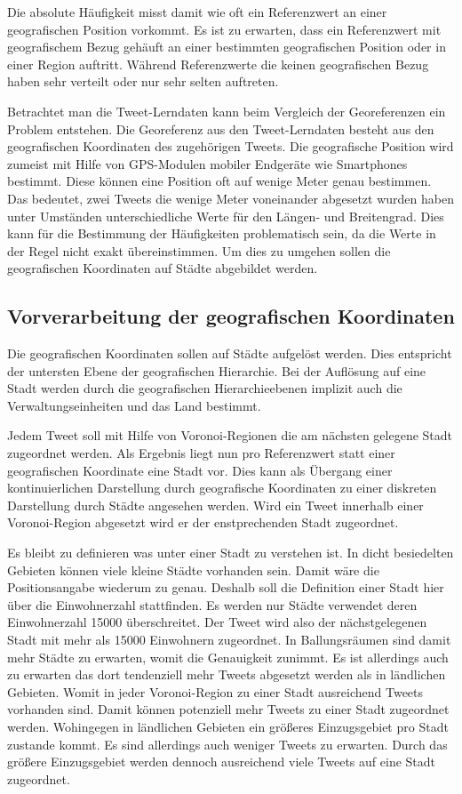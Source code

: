 			Die absolute Häufigkeit misst damit wie oft ein Referenzwert an einer geografischen Position vorkommt.
			Es ist zu erwarten, dass ein Referenzwert mit geografischem Bezug gehäuft an einer bestimmten geografischen Position oder in einer Region auftritt.
			Während Referenzwerte die keinen geografischen Bezug haben sehr verteilt oder nur sehr selten auftreten. 

			Betrachtet man die Tweet-Lerndaten kann beim Vergleich der Georeferenzen ein Problem entstehen.
			Die Georeferenz aus den Tweet-Lerndaten besteht aus den geografischen Koordinaten des zugehörigen Tweets.
			Die geografische Position wird zumeist mit Hilfe von GPS-Modulen mobiler Endgeräte wie Smartphones bestimmt. 
			Diese können eine Position oft auf wenige Meter genau bestimmen.
			Das bedeutet, zwei Tweets die wenige Meter voneinander abgesetzt wurden haben unter Umständen unterschiedliche Werte für den Längen- und Breitengrad.
			Dies kann für die Bestimmung der Häufigkeiten problematisch sein, da die Werte in der Regel nicht exakt übereinstimmen.
			Um dies zu umgehen sollen die geografischen Koordinaten auf Städte abgebildet werden.

		\subsection{Vorverarbeitung der geografischen Koordinaten}

			Die geografischen Koordinaten sollen auf Städte aufgelöst werden.
			Dies entspricht der untersten Ebene der geografischen Hierarchie.
			Bei der Auflösung auf eine Stadt werden durch die geografischen Hierarchieebenen implizit auch die Verwaltungseinheiten und das Land bestimmt.

			Jedem Tweet soll mit Hilfe von Voronoi-Regionen die am nächsten gelegene Stadt zugeordnet werden.
			Als Ergebnis liegt nun pro Referenzwert statt einer geografischen Koordinate eine Stadt vor.
			Dies kann als Übergang einer kontinuierlichen Darstellung durch geografische Koordinaten zu einer diskreten Darstellung durch Städte angesehen werden. 
			Wird ein Tweet innerhalb einer Voronoi-Region abgesetzt wird er der enstprechenden Stadt zugeordnet.

			Es bleibt zu definieren was unter einer Stadt zu verstehen ist.
			In dicht besiedelten Gebieten können viele kleine Städte vorhanden sein. 
			Damit wäre die Positionsangabe wiederum zu genau.
			Deshalb soll die Definition einer Stadt hier über die Einwohnerzahl stattfinden.
			Es werden nur Städte verwendet deren Einwohnerzahl 15000 überschreitet.
			Der Tweet wird also der nächstgelegenen Stadt mit mehr als 15000 Einwohnern zugeordnet.
			In Ballungsräumen sind damit mehr Städte zu erwarten, womit die Genauigkeit zunimmt.
			Es ist allerdings auch zu erwarten das dort tendenziell mehr Tweets abgesetzt werden als in ländlichen Gebieten.
			Womit in jeder Voronoi-Region zu einer Stadt ausreichend Tweets vorhanden sind.
			Damit können potenziell mehr Tweets zu einer Stadt zugeordnet werden.
			Wohingegen in ländlichen Gebieten ein größeres Einzugsgebiet pro Stadt zustande kommt.
			Es sind allerdings auch weniger Tweets zu erwarten. 
			Durch das größere Einzugsgebiet werden dennoch ausreichend viele Tweets auf eine Stadt zugeordnet. 

